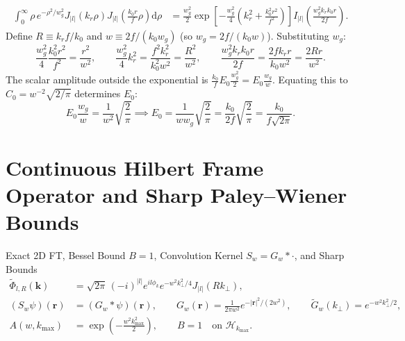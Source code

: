 \documentclass[10pt,letterpaper]{article}
\newcommand{\abs}[1]{\lvert #1 \rvert}
\newcommand{\dd}{\mathrm{d}}
\numberwithin{equation}{section}
\begin{document}
\begin{align}
  \int_0^\infty \rho\,e^{-\rho^2/w_g^2} J_{\abs{l}}(k_r\rho) J_{\abs{l}}\!\left(\frac{k_0 r}{f}\rho\right)\dd\rho
  &= \frac{w_g^2}{2}\exp\!\left[-\frac{w_g^2}{4}\left(k_r^2 + \frac{k_0^2 r^2}{f^2}\right)\right] I_{\abs{l}}\!\left(\frac{w_g^2 k_r k_0 r}{2f}\right).
\end{align}
Define $R \equiv k_r f / k_0$ and $w \equiv 2f / (k_0 w_g)$ (so $w_g = 2f/(k_0 w)$). Substituting $w_g$:
\begin{equation}
  \frac{w_g^2}{4}\frac{k_0^2 r^2}{f^2} = \frac{r^2}{w^2}, \qquad \frac{w_g^2}{4}k_r^2 = \frac{f^2 k_r^2}{k_0^2 w^2} = \frac{R^2}{w^2}, \qquad \frac{w_g^2 k_r k_0 r}{2f} = \frac{2 f k_r r}{k_0 w^2} = \frac{2Rr}{w^2}.
\end{equation}
The scalar amplitude outside the exponential is $\frac{k_0}{f} E_0 \frac{w_g^2}{2} = E_0 \frac{w_g}{w}$. Equating this to $C_0 = w^{-2}\sqrt{2/\pi}$ determines $E_0$:
\begin{equation}
  E_0 \frac{w_g}{w} = \frac{1}{w^2}\sqrt{\frac{2}{\pi}} \implies E_0 = \frac{1}{w w_g}\sqrt{\frac{2}{\pi}} = \frac{k_0}{2f}\sqrt{\frac{2}{\pi}} = \frac{k_0}{f\sqrt{2\pi}}.
\end{equation}

\section{Continuous Hilbert Frame Operator and Sharp Paley--Wiener Bounds}
\label{sec:p1_frame}

\begin{targeteq}{Exact 2D FT, Bessel Bound $B=1$, Convolution Kernel $S_w = G_w * \cdot$, and Sharp Bounds}
\begin{align*}
  \widetilde{\Phi}_{l,R}(\mathbf{k}) &= \sqrt{2\pi}\,(-i)^{\abs{l}} e^{il\phi_k} e^{-w^2 k_\perp^2/4} J_{\abs{l}}(Rk_\perp), \\
  (S_w\psi)(\mathbf{r}) &= (G_w * \psi)(\mathbf{r}), \qquad G_w(\mathbf{r}) = \frac{1}{2\pi w^2}e^{-\abs{\mathbf{r}}^2/(2w^2)}, \qquad \widetilde{G}_w(k_\perp) = e^{-w^2 k_\perp^2/2}, \\
  A(w,k_{\max}) &= \exp\!\left(-\frac{w^2 k_{\max}^2}{2}\right), \qquad B = 1 \quad\text{on }\mathcal{H}_{k_{\max}}.
\end{align*}
\end{targeteq}
\end{document}
